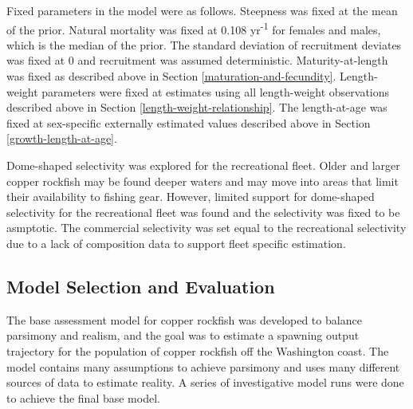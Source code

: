 \documentclass[11pt,
  english,
  a4paper,
]{article}
\begin{document}
Fixed parameters in the model were as follows. Steepness was fixed at the mean of the prior. Natural mortality was fixed at 0.108 yr\textsuperscript{-1} for females and males, which is the median of the prior. The standard deviation of recruitment deviates was fixed at 0 and recruitment was assumed deterministic. Maturity-at-length was fixed as described above in Section \ref{maturation-and-fecundity}. Length-weight parameters were fixed at estimates using all length-weight observations described above in Section \ref{length-weight-relationship}. The length-at-age was fixed at sex-specific externally estimated values described above in Section \ref{growth-length-at-age}.

\leavevmode\tagmcend\tagstructend\par


Dome-shaped selectivity was explored for the recreational fleet. Older and larger copper rockfish may be found deeper waters and may move into areas that limit their availability to fishing gear. However, limited support for dome-shaped selectivity for the recreational fleet was found and the selectivity was fixed to be asmptotic. The commercial selectivity was set equal to the recreational selectivity due to a lack of composition data to support fleet specific estimation.

\leavevmode\tagmcend\tagstructend\par


\hypertarget{model-selection-and-evaluation}{%
\subsection{Model Selection and Evaluation}\label{model-selection-and-evaluation}}

\leavevmode\tagmcend\tagstructend


The base assessment model for copper rockfish was developed to balance parsimony and realism, and the goal was to estimate a spawning output trajectory for the population of copper rockfish off the Washington coast. The model contains many assumptions to achieve parsimony and uses many different sources of data to estimate reality. A series of investigative model runs were done to achieve the final base model.

\leavevmode\tagmcend\tagstructend\par
\end{document}

